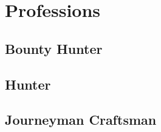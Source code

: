 
\section{Professions}
\subsection{Bounty Hunter}
\subsection{Hunter}
\subsection{Journeyman Craftsman}
